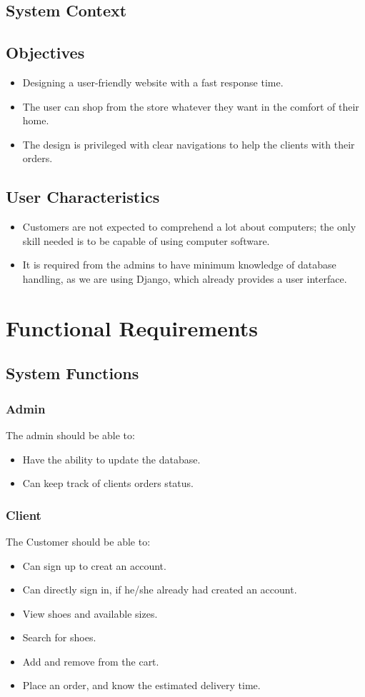 \documentclass[12pt]{article}
\begin{document}
\subsection{System Context}

\subsection{Objectives}
\begin{itemize}
 \item Designing a user-friendly website with a fast response time.
 \item The user can shop from the store whatever they want in the comfort of their home.
 \item The design is privileged with clear navigations to help the clients with their orders.
\end{itemize}

\subsection{ User Characteristics}
\begin{itemize}
\item Customers are not expected to comprehend a lot about computers; the only skill needed is to be capable of using computer software.
\item It is required from the admins to have minimum knowledge of database handling, as we are using Django, which already provides a user interface. 
\end{itemize}

\pagebreak 
\section{Functional Requirements}
\subsection{System Functions}\label{System Functions}
\subsubsection{Admin}
The admin should be able to:
\begin{itemize}
\item Have the ability to update the database.
\item Can keep track of clients orders status.
\end{itemize}
\subsubsection{Client}
The Customer should be able to:
\begin{itemize}
\item Can sign up to creat an account.
\item Can directly sign in, if he/she already had created an account.
\item View shoes and available sizes.
\item Search for shoes.
\item Add and remove from the cart.
\item Place an order, and know the estimated delivery time.
\end{itemize}
\end{document}
